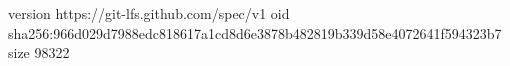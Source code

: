 version https://git-lfs.github.com/spec/v1
oid sha256:966d029d7988edc818617a1cd8d6e3878b482819b339d58e4072641f594323b7
size 98322
